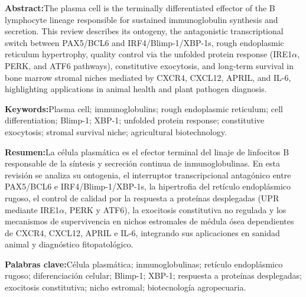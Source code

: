 \documentclass[10pt,spanish,letterpaper,twocolumn]{article}
\begin{document}
{  \noindent\begin{minipage}[t]{0.485\textwidth}
  \begin{tcolorbox}[colback=abstractboxbg, colframe=abstractboxborder, boxrule=0.6pt, arc=1.5mm, left=6pt, right=6pt, top=5pt, bottom=5pt]
  {\fontsize{7.8}{9.8}\selectfont
  \textbf{Abstract:}\enspace The plasma cell is the terminally differentiated effector of the B lymphocyte lineage responsible for sustained immunoglobulin synthesis and secretion. This review describes its ontogeny, the antagonistic transcriptional switch between PAX5/BCL6 and IRF4/Blimp-1/XBP-1s, rough endoplasmic reticulum hypertrophy, quality control via the unfolded protein response (IRE1$\alpha$, PERK, and ATF6 pathways), constitutive exocytosis, and long-term survival in bone marrow stromal niches mediated by CXCR4, CXCL12, APRIL, and IL-6, highlighting applications in animal health and plant pathogen diagnosis.
  \par\vspace{0.08cm}
  \textbf{Keywords:}\enspace Plasma cell; immunoglobulins; rough endoplasmic reticulum; cell differentiation; Blimp-1; XBP-1; unfolded protein response; constitutive exocytosis; stromal survival niche; agricultural biotechnology.
  }
  \end{tcolorbox}
  \end{minipage}\hfill
  \begin{minipage}[t]{0.485\textwidth}
  \begin{tcolorbox}[colback=resumenboxbg, colframe=resumenboxborder, boxrule=0.6pt, arc=1.5mm, left=6pt, right=6pt, top=5pt, bottom=5pt]
  {\fontsize{7.8}{9.8}\selectfont
  \textbf{Resumen:}\enspace La célula plasmática es el efector terminal del linaje de linfocitos B responsable de la síntesis y secreción continua de inmunoglobulinas. En esta revisión se analiza su ontogenia, el interruptor transcripcional antagónico entre PAX5/BCL6 e IRF4/Blimp-1/XBP-1s, la hipertrofia del retículo endoplásmico rugoso, el control de calidad por la respuesta a proteínas desplegadas (UPR mediante IRE1$\alpha$, PERK y ATF6), la exocitosis constitutiva no regulada y los mecanismos de supervivencia en nichos estromales de médula ósea dependientes de CXCR4, CXCL12, APRIL e IL-6, integrando sus aplicaciones en sanidad animal y diagnóstico fitopatológico.
  \par\vspace{0.08cm}
  \textbf{Palabras clave:}\enspace Célula plasmática; inmunoglobulinas; retículo endoplásmico rugoso; diferenciación celular; Blimp-1; XBP-1; respuesta a proteínas desplegadas; exocitosis constitutiva; nicho estromal; biotecnología agropecuaria.
  }
  \end{tcolorbox}
  \end{minipage}
  \vspace{0.12cm}

}
\end{document}
